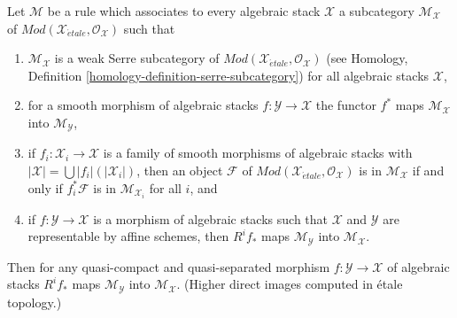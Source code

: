 \begin{lemma}
\label{lemma-general-pushforward}
Let $\mathcal{M}$ be a rule which associates to every algebraic stack
$\mathcal{X}$ a subcategory $\mathcal{M}_\mathcal{X}$ of
$\textit{Mod}(\mathcal{X}_{\acute{e}tale}, \mathcal{O}_\mathcal{X})$
such that
\begin{enumerate}
\item $\mathcal{M}_\mathcal{X}$ is a weak Serre subcategory
of $\textit{Mod}(\mathcal{X}_{\acute{e}tale}, \mathcal{O}_\mathcal{X})$
(see Homology, Definition \ref{homology-definition-serre-subcategory})
for all algebraic stacks $\mathcal{X}$,
\item for a smooth morphism of algebraic stacks
$f : \mathcal{Y} \to \mathcal{X}$ the functor $f^*$ maps
$\mathcal{M}_\mathcal{X}$ into $\mathcal{M}_\mathcal{Y}$,
\item if $f_i : \mathcal{X}_i \to \mathcal{X}$ is a family of smooth
morphisms of algebraic stacks with
$|\mathcal{X}| = \bigcup |f_i|(|\mathcal{X}_i|)$, then an object
$\mathcal{F}$ of
$\textit{Mod}(\mathcal{X}_{\acute{e}tale}, \mathcal{O}_\mathcal{X})$
is in $\mathcal{M}_\mathcal{X}$ if and only if
$f_i^*\mathcal{F}$ is in $\mathcal{M}_{\mathcal{X}_i}$ for all $i$, and
\item if $f : \mathcal{Y} \to \mathcal{X}$ is a morphism of algebraic
stacks such that $\mathcal{X}$ and $\mathcal{Y}$ are representable
by affine schemes, then $R^if_*$ maps $\mathcal{M}_\mathcal{Y}$
into $\mathcal{M}_\mathcal{X}$.
\end{enumerate}
Then for any quasi-compact and quasi-separated morphism 
$f : \mathcal{Y} \to \mathcal{X}$ of algebraic stacks
$R^if_*$ maps $\mathcal{M}_\mathcal{Y}$
into $\mathcal{M}_\mathcal{X}$. (Higher direct images computed in \'etale
topology.)
\end{lemma}

